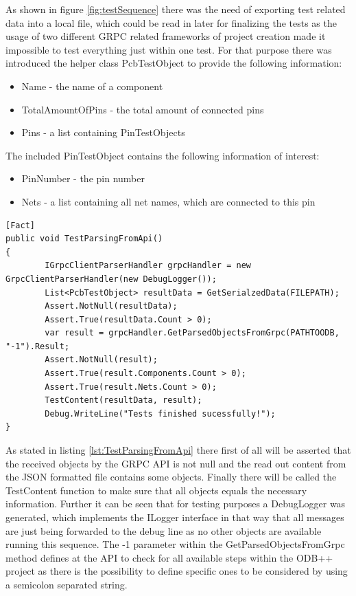 As shown in figure \ref{fig:testSequence} there was the need of exporting test related data into a local file, which could be read in later for finalizing the tests as the usage of two different \ac{GRPC} related frameworks of project creation made it impossible to test everything just within one test. For that purpose there was introduced the helper class PcbTestObject to provide the following information:
\begin{itemize}
	\item Name - the name of a component
	\item TotalAmountOfPins - the total amount of connected pins
	\item Pins - a list containing PinTestObjects
\end{itemize}

The included PinTestObject contains the following information of interest:
\begin{itemize}
	\item PinNumber - the pin number
	\item Nets - a list containing all net names, which are connected to this pin
\end{itemize}

\begin{lstlisting}[language={[Sharp]C},caption={TestParsingFromApi from TestDotNetCore},captionpos=b,label=lst:TestParsingFromApi]
[Fact]
public void TestParsingFromApi()
{
		IGrpcClientParserHandler grpcHandler = new GrpcClientParserHandler(new DebugLogger());
		List<PcbTestObject> resultData = GetSerialzedData(FILEPATH);
		Assert.NotNull(resultData);
		Assert.True(resultData.Count > 0);
		var result = grpcHandler.GetParsedObjectsFromGrpc(PATHTOODB, "-1").Result;
		Assert.NotNull(result);
		Assert.True(result.Components.Count > 0);
		Assert.True(result.Nets.Count > 0);
		TestContent(resultData, result);
		Debug.WriteLine("Tests finished sucessfully!");
}
\end{lstlisting}

As stated in listing \ref{lst:TestParsingFromApi} there first of all will be asserted that the received objects by the \ac{GRPC} \ac{API} is not null and the read out content from the \ac{JSON} formatted file contains some objects. Finally there will be called the TestContent function to make sure that all objects equals the necessary information. Further it can be seen that for testing purposes a DebugLogger was generated, which implements the ILogger interface in that way that all messages are just being forwarded to the debug line as no other objects are available running this sequence. The -1 parameter within the GetParsedObjectsFromGrpc method defines at the \ac{API} to check for all available steps within the \ac{ODB}++ project as there is the possibility to define specific ones to be considered by using a semicolon separated string.


